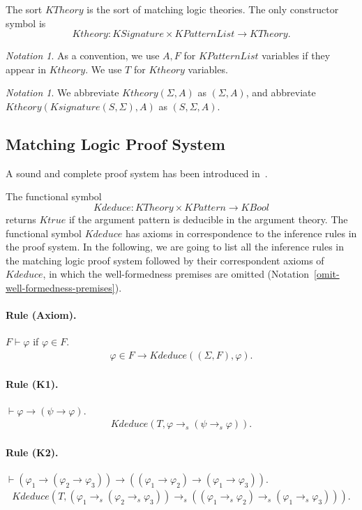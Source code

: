 \documentclass[UTF8]{article}
\newcounter{thmcounter}
\theoremstyle{plain}
\theoremstyle{definition}
\theoremstyle{remark}
\newtheorem{notation}[thmcounter]{Notation}
\newcommand{\KBool}{\mathit{KBool}}
\newcommand{\Ktrue}{\mathit{Ktrue}}
\newcommand{\KPattern}{\mathit{KPattern}}
\newcommand{\KPatternList}{\mathit{KPatternList}}
\newcommand{\kimplies}{\to}
\newcommand{\KSignature}{\mathit{KSignature}}
\newcommand{\Ksignature}{\mathit{Ksignature}}
\newcommand{\KTheory}{\mathit{KTheory}}
\newcommand{\Ktheory}{\mathit{Ktheory}}
\newcommand{\Kdeduce}{\mathit{Kdeduce}}
\begin{document}
The sort $\KTheory$ is the sort of matching logic theories. The only constructor symbol is 
$$\Ktheory \colon \KSignature \times \KPatternList \to \KTheory.$$

\begin{notation}
	As a convention, we use $A, F$ for $\KPatternList$ variables if they appear in $\Ktheory$. We use $T$ for $\Ktheory$ variables.
\end{notation}
\begin{notation}
	We abbreviate $\Ktheory(\Sigma, A)$ as $(\Sigma, A)$, and abbreviate $\Ktheory(\Ksignature(S, \Sigma), A)$ as $(S, \Sigma, A)$. 
\end{notation}

\subsection{Matching Logic Proof System}

A sound and complete proof system has been introduced in~\cite{?}. 

The functional symbol
$$
\Kdeduce \colon \KTheory \times \KPattern \to \KBool
$$
returns $\Ktrue$ if the argument pattern is deducible in the argument theory.
The functional symbol $\Kdeduce$ has axioms in correspondence to the inference rules in the proof system.
In the following, we are going to list all the inference rules in the matching 
logic proof system followed by their correspondent axioms of $\Kdeduce$, in 
which the well-formedness premises are omitted 
(Notation~\ref{omit-well-formedness-premises}).

\paragraph{Rule (Axiom).}
$F \vdash \varphi$ if $\varphi \in F$.
\begin{align*}
\varphi \in F \to \Kdeduce((\Sigma, F), \varphi).
\end{align*}

\paragraph{Rule (K1).}
$\vdash \varphi \to (\psi \to \varphi)$.
\begin{align*}
\Kdeduce(T, \varphi \kimplies_s (\psi \kimplies_s \varphi)).
\end{align*}

\paragraph{Rule (K2).}
$\vdash (\varphi_1 \to (\varphi_2 \to \varphi_3)) \to ((\varphi_1 \to \varphi_2) \to (\varphi_1 \to \varphi_3))$.
\begin{align*}
\Kdeduce(T, (\varphi_1 \kimplies_s (\varphi_2 \kimplies_s \varphi_3)) 
\kimplies_s ((\varphi_1 \kimplies_s \varphi_2) \kimplies_s (\varphi_1 
\kimplies_s \varphi_3))).
\end{align*}
\end{document}
